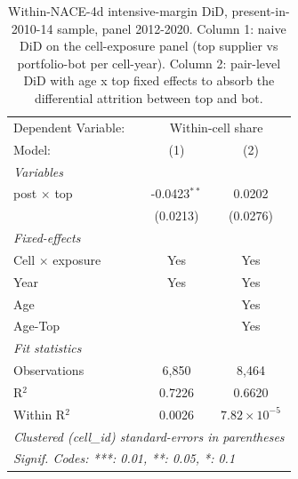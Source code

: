 
\begin{table}[htbp]
   \caption{\label{tab:phase4_within_intensive_did_coefs} Within-NACE-4d intensive-margin DiD, present-in-2010-14 sample, panel 2012-2020. Column 1: naive DiD on the cell-exposure panel (top supplier vs portfolio-bot per cell-year). Column 2: pair-level DiD with age x top fixed effects to absorb the differential attrition between top and bot.}
   \centering
   \begin{tabular}{lcc}
      \tabularnewline \midrule \midrule
      Dependent Variable: & \multicolumn{2}{c}{Within-cell share}\\
      Model:              & (1)            & (2)\\  
      \midrule
      \emph{Variables}\\
      post $\times$ top   & -0.0423$^{**}$ & 0.0202\\   
                          & (0.0213)       & (0.0276)\\   
      \midrule
      \emph{Fixed-effects}\\
      Cell $\times$ exposure  & Yes            & Yes\\
      Year                & Yes            & Yes\\  
      Age                 &                & Yes\\  
      Age-Top             &                & Yes\\  
      \midrule
      \emph{Fit statistics}\\
      Observations        & 6,850          & 8,464\\  
      R$^2$               & 0.7226         & 0.6620\\  
      Within R$^2$        & 0.0026         & $7.82\times 10^{-5}$\\   
      \midrule \midrule
      \multicolumn{3}{l}{\emph{Clustered (cell\_id) standard-errors in parentheses}}\\
      \multicolumn{3}{l}{\emph{Signif. Codes: ***: 0.01, **: 0.05, *: 0.1}}\\
   \end{tabular}
\end{table}


